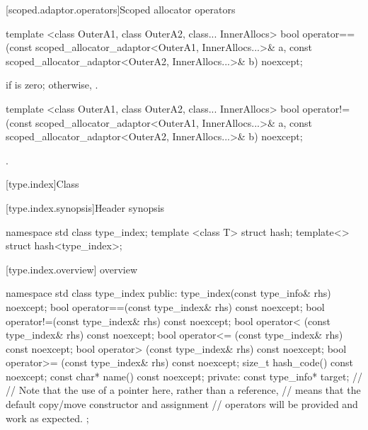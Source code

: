 [scoped.adaptor.operators]{Scoped allocator operators}

%
%
\begin{itemdecl}
template <class OuterA1, class OuterA2, class... InnerAllocs>
  bool operator==(const scoped_allocator_adaptor<OuterA1, InnerAllocs...>& a,
                  const scoped_allocator_adaptor<OuterA2, InnerAllocs...>& b) noexcept;
\end{itemdecl}

\begin{itemdescr}
\pnum
\returns {} if
 is zero;
otherwise, 
\tcode{\&\&} .
\end{itemdescr}

%
%
\begin{itemdecl}
template <class OuterA1, class OuterA2, class... InnerAllocs>
  bool operator!=(const scoped_allocator_adaptor<OuterA1, InnerAllocs...>& a,
                  const scoped_allocator_adaptor<OuterA2, InnerAllocs...>& b) noexcept;
\end{itemdecl}

\begin{itemdescr}
\pnum
\returns {}.
\end{itemdescr}

[type.index]{Class }

%
[type.index.synopsis]{Header  synopsis}

\begin{codeblock}
namespace std {
  class type_index;
  template <class T> struct hash;
  template<> struct hash<type_index>;
}
\end{codeblock}

[type.index.overview]{ overview}

\begin{codeblock}
namespace std {
  class type_index {
  public:
    type_index(const type_info& rhs) noexcept;
    bool operator==(const type_index& rhs) const noexcept;
    bool operator!=(const type_index& rhs) const noexcept;
    bool operator< (const type_index& rhs) const noexcept;
    bool operator<= (const type_index& rhs) const noexcept;
    bool operator> (const type_index& rhs) const noexcept;
    bool operator>= (const type_index& rhs) const noexcept;
    size_t hash_code() const noexcept;
    const char* name() const noexcept;
  private:
    const type_info* target;    // \expos
    // Note that the use of a pointer here, rather than a reference,
    // means that the default copy/move constructor and assignment
    // operators will be provided and work as expected.
  };
}
\end{codeblock}

